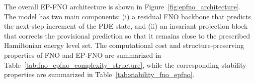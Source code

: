 \documentclass[11pt,a4paper]{article}
\theoremstyle{definition}
\theoremstyle{remark}
\numberwithin{equation}{section}
\numberwithin{figure}{section}
\numberwithin{table}{section}
\begin{document}
The overall EP-FNO architecture is shown in Figure~\ref{fig:epfno_architecture}. The model
has two main components: (i) a residual FNO backbone that predicts the
next-step increment of the PDE state, and (ii) an invariant projection block that corrects the provisional prediction so that it remains close to the prescribed Hamiltonian energy level set. The computational cost and structure-preserving properties of FNO and EP-FNO are
summarized in Table~\ref{tab:fno_epfno_complexity_structure}, while the corresponding
stability properties are summarized in Table~\ref{tab:stability_fno_epfno}. %

\end{document}

